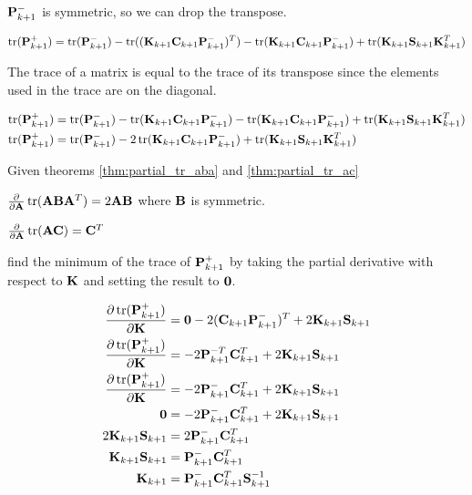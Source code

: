 $\mathbf{P}_{k+1}^-$ is symmetric, so we can drop the transpose.

\begin{equation*}
  \operatorname{tr}(\mathbf{P}_{k+1}^+) = \operatorname{tr}(\mathbf{P}_{k+1}^-) -
    \operatorname{tr}((\mathbf{K}_{k+1}\mathbf{C}_{k+1}\mathbf{P}_{k+1}^-)^T) -
    \operatorname{tr}(\mathbf{K}_{k+1}\mathbf{C}_{k+1}\mathbf{P}_{k+1}^-) +
    \operatorname{tr}(\mathbf{K}_{k+1}\mathbf{S}_{k+1}\mathbf{K}_{k+1}^T)
\end{equation*}

The trace of a matrix is equal to the trace of its transpose since the elements
used in the trace are on the diagonal.

\begin{align*}
  \operatorname{tr}(\mathbf{P}_{k+1}^+) &= \operatorname{tr}(\mathbf{P}_{k+1}^-) -
    \operatorname{tr}(\mathbf{K}_{k+1}\mathbf{C}_{k+1}\mathbf{P}_{k+1}^-) -
    \operatorname{tr}(\mathbf{K}_{k+1}\mathbf{C}_{k+1}\mathbf{P}_{k+1}^-) +
    \operatorname{tr}(\mathbf{K}_{k+1}\mathbf{S}_{k+1}\mathbf{K}_{k+1}^T) \\
  \operatorname{tr}(\mathbf{P}_{k+1}^+) &= \operatorname{tr}(\mathbf{P}_{k+1}^-) -
    2\operatorname{tr}(\mathbf{K}_{k+1}\mathbf{C}_{k+1}\mathbf{P}_{k+1}^-) +
    \operatorname{tr}(\mathbf{K}_{k+1}\mathbf{S}_{k+1}\mathbf{K}_{k+1}^T)
\end{align*}

Given theorems \ref{thm:partial_tr_aba} and \ref{thm:partial_tr_ac}

\begin{theorem}
  \label{thm:partial_tr_aba}

  $\frac{\partial}{\partial\mathbf{A}}\operatorname{tr}(\mathbf{A}\mathbf{B}\mathbf{A}^T) =
    2\mathbf{A}\mathbf{B}$ where $\mathbf{B}$ is symmetric.
\end{theorem}

\begin{theorem}
  \label{thm:partial_tr_ac}

  $\frac{\partial}{\partial\mathbf{A}}\operatorname{tr}(\mathbf{A}\mathbf{C}) = \mathbf{C}^T$
\end{theorem}

find the minimum of the trace of $\mathbf{P}_{k+1}^+$ by taking the partial
derivative with respect to $\mathbf{K}$ and setting the result to $\mathbf{0}$.

\begin{align*}
  \frac{\partial\operatorname{tr}(\mathbf{P}_{k+1}^+)}{\partial\mathbf{K}} &=
    \mathbf{0} - 2(\mathbf{C}_{k+1}\mathbf{P}_{k+1}^-)^T + 2\mathbf{K}_{k+1}\mathbf{S}_{k+1} \\
  \frac{\partial\operatorname{tr}(\mathbf{P}_{k+1}^+)}{\partial\mathbf{K}} &=
    -2\mathbf{P}_{k+1}^{-T}\mathbf{C}_{k+1}^T + 2\mathbf{K}_{k+1}\mathbf{S}_{k+1} \\
  \frac{\partial\operatorname{tr}(\mathbf{P}_{k+1}^+)}{\partial\mathbf{K}} &=
    -2\mathbf{P}_{k+1}^-\mathbf{C}_{k+1}^T + 2\mathbf{K}_{k+1}\mathbf{S}_{k+1} \\
  \mathbf{0} &= -2\mathbf{P}_{k+1}^-\mathbf{C}_{k+1}^T + 2\mathbf{K}_{k+1}\mathbf{S}_{k+1} \\
  2\mathbf{K}_{k+1}\mathbf{S}_{k+1} &= 2\mathbf{P}_{k+1}^-\mathbf{C}_{k+1}^T \\
  \mathbf{K}_{k+1}\mathbf{S}_{k+1} &= \mathbf{P}_{k+1}^-\mathbf{C}_{k+1}^T \\
  \mathbf{K}_{k+1} &= \mathbf{P}_{k+1}^-\mathbf{C}_{k+1}^T\mathbf{S}_{k+1}^{-1}
\end{align*}

